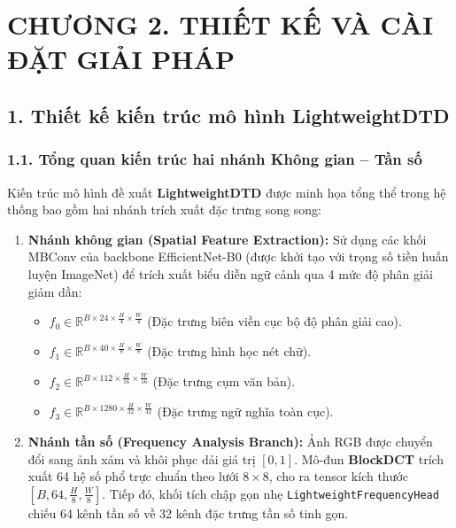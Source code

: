 \section{CHƯƠNG 2. THIẾT KẾ VÀ CÀI ĐẶT GIẢI PHÁP}
\vspace{0.5cm}

\subsection{1. Thiết kế kiến trúc mô hình LightweightDTD}

\subsubsection{1.1. Tổng quan kiến trúc hai nhánh Không gian -- Tần số}
\indent\indent Kiến trúc mô hình đề xuất \textbf{LightweightDTD} được minh họa tổng thể trong hệ thống bao gồm hai nhánh trích xuất đặc trưng song song:
\begin{enumerate}
    \item \textbf{Nhánh không gian (Spatial Feature Extraction):} Sử dụng các khối MBConv của backbone EfficientNet-B0 (được khởi tạo với trọng số tiền huấn luyện ImageNet) để trích xuất biểu diễn ngữ cảnh qua 4 mức độ phân giải giảm dần:
    \begin{itemize}[label={--}, itemsep=1pt]
        \item $f_0 \in \mathbb{R}^{B \times 24 \times \frac{H}{4} \times \frac{W}{4}}$ (Đặc trưng biên viền cục bộ độ phân giải cao).
        \item $f_1 \in \mathbb{R}^{B \times 40 \times \frac{H}{8} \times \frac{W}{8}}$ (Đặc trưng hình học nét chữ).
        \item $f_2 \in \mathbb{R}^{B \times 112 \times \frac{H}{16} \times \frac{W}{16}}$ (Đặc trưng cụm văn bản).
        \item $f_3 \in \mathbb{R}^{B \times 1280 \times \frac{H}{32} \times \frac{W}{32}}$ (Đặc trưng ngữ nghĩa toàn cục).
    \end{itemize}
    \item \textbf{Nhánh tần số (Frequency Analysis Branch):} Ảnh RGB được chuyển đổi sang ảnh xám và khôi phục dải giá trị $[0, 1]$. Mô-đun \textbf{BlockDCT} trích xuất 64 hệ số phổ trực chuẩn theo lưới $8 \times 8$, cho ra tensor kích thước $[B, 64, \frac{H}{8}, \frac{W}{8}]$. Tiếp đó, khối tích chập gọn nhẹ \texttt{LightweightFrequencyHead} chiếu 64 kênh tần số về 32 kênh đặc trưng tần số tinh gọn.
\end{enumerate}

